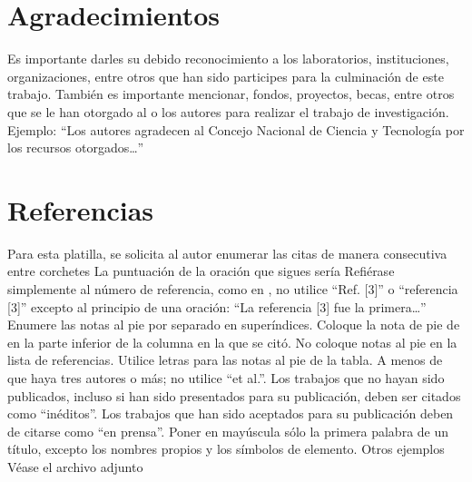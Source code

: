     \section{Agradecimientos}
    
    Es importante darles su debido reconocimiento a los laboratorios, instituciones, organizaciones, entre otros que han sido participes para la culminación de este trabajo. También es importante mencionar, fondos, proyectos, becas, entre otros que se le han otorgado al o los autores para realizar el trabajo de investigación. Ejemplo: “Los autores agradecen al Concejo Nacional de Ciencia y Tecnología por los recursos otorgados…”
    
    \section*{Referencias}
    Para esta platilla, se solicita al autor enumerar las citas de manera consecutiva entre corchetes 
    La puntuación de la oración que sigues sería  
    Refiérase simplemente al número de referencia, como en , no utilice “Ref. [3]” o “referencia [3]” excepto al principio de una oración: “La referencia [3] fue la primera…”
    Enumere las notas al pie por separado en superíndices. Coloque la nota de pie de en la parte inferior de la columna en la que se citó. No coloque notas al pie en la lista de referencias. Utilice letras para las notas al pie de la tabla.
    A menos de que haya tres autores o más; no utilice “et al.”. Los trabajos que no hayan sido publicados, incluso si han sido presentados para su publicación, deben ser citados como “inéditos”. Los trabajos que han sido aceptados para su publicación deben de citarse como “en prensa”. Poner en mayúscula sólo la primera palabra de un título, excepto los nombres propios y los símbolos de elemento. 
    Otros ejemplos 
    Véase el archivo adjunto 
    
    
    
